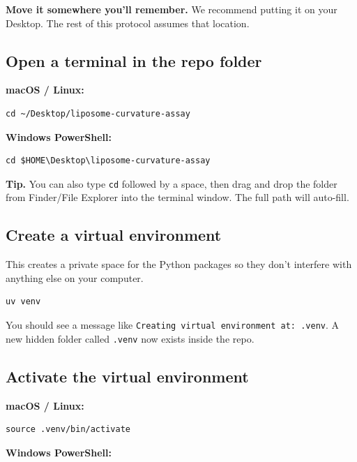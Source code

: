 \documentclass[11pt]{article}
\newcommand{\code}[1]{\texttt{#1}}
\begin{document}
\textbf{Move it somewhere you'll remember.} We recommend putting it on
your Desktop. The rest of this protocol assumes that location.

\subsection{Open a terminal in the repo folder}

\textbf{macOS / Linux:}

\begin{lstlisting}
cd ~/Desktop/liposome-curvature-assay
\end{lstlisting}

\textbf{Windows PowerShell:}

\begin{lstlisting}
cd $HOME\Desktop\liposome-curvature-assay
\end{lstlisting}

\begin{tipbox}
\textbf{Tip.} You can also type \code{cd} followed by a space, then
drag and drop the folder from Finder/File Explorer into the terminal
window. The full path will auto-fill.
\end{tipbox}

\subsection{Create a virtual environment}

This creates a private space for the Python packages so they don't
interfere with anything else on your computer.

\begin{lstlisting}
uv venv
\end{lstlisting}

You should see a message like \code{Creating virtual environment at:
.venv}. A new hidden folder called \code{.venv} now exists inside the
repo.

\subsection{Activate the virtual environment}\label{sec:activate}

\textbf{macOS / Linux:}

\begin{lstlisting}
source .venv/bin/activate
\end{lstlisting}

\textbf{Windows PowerShell:}
\end{document}
